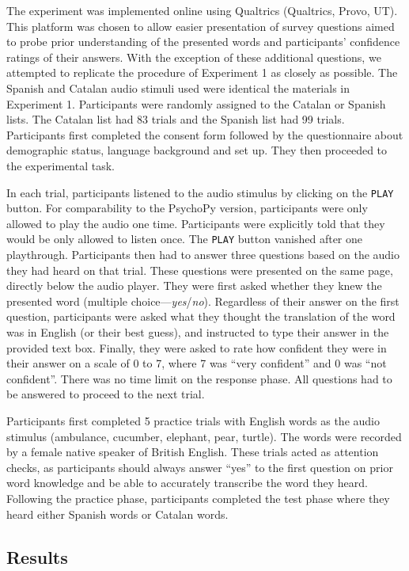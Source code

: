 \documentclass[
]{article}
\begin{document}
The experiment was implemented online using Qualtrics (Qualtrics, Provo,
UT). This platform was chosen to allow easier presentation of survey
questions aimed to probe prior understanding of the presented words and
participants' confidence ratings of their answers. With the exception of
these additional questions, we attempted to replicate the procedure of
Experiment 1 as closely as possible. The Spanish and Catalan audio
stimuli used were identical the materials in Experiment 1. Participants
were randomly assigned to the Catalan or Spanish lists. The Catalan list
had 83 trials and the Spanish list had 99 trials. Participants first
completed the consent form followed by the questionnaire about
demographic status, language background and set up. They then proceeded
to the experimental task.

In each trial, participants listened to the audio stimulus by clicking
on the \texttt{PLAY} button. For comparability to the PsychoPy version,
participants were only allowed to play the audio one time. Participants
were explicitly told that they would be only allowed to listen once. The
\texttt{PLAY} button vanished after one playthrough. Participants then
had to answer three questions based on the audio they had heard on that
trial. These questions were presented on the same page, directly below
the audio player. They were first asked whether they knew the presented
word (multiple choice---\emph{yes}/\emph{no}). Regardless of their
answer on the first question, participants were asked what they thought
the translation of the word was in English (or their best guess), and
instructed to type their answer in the provided text box. Finally, they
were asked to rate how confident they were in their answer on a scale of
0 to 7, where 7 was ``very confident'' and 0 was ``not confident''.
There was no time limit on the response phase. All questions had to be
answered to proceed to the next trial.

Participants first completed 5 practice trials with English words as the
audio stimulus (ambulance, cucumber, elephant, pear, turtle). The words
were recorded by a female native speaker of British English. These
trials acted as attention checks, as participants should always answer
``yes'' to the first question on prior word knowledge and be able to
accurately transcribe the word they heard. Following the practice phase,
participants completed the test phase where they heard either Spanish
words or Catalan words.

\subsection{Results}\label{results-2}
\end{document}
